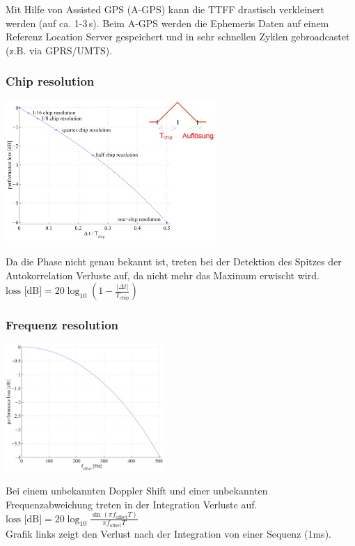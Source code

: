 	Mit Hilfe von Assisted GPS (A-GPS) kann die TTFF drastisch verkleinert werden (auf ca. 1-3\,s). Beim A-GPS werden die 
	Ephemeris Daten auf einem Referenz Location Server gespeichert und in sehr schnellen Zyklen gebroadcastet (z.B. via GPRS/UMTS).
	
\subsubsection{Chip resolution}
	\begin{minipage}{10cm}
	    \includegraphics[width=8cm]{./bilder/GPS-ChipResolution.png}
    \end{minipage}
	\begin{minipage}{8cm}
    	Da die Phase nicht genau bekannt ist, treten bei der Detektion des
		Spitzes der Autokorrelation Verluste auf, da nicht mehr das Maximum erwischt
		wird.\\
		$\text{loss [dB]}= 20 \log_{10}\left(1-\frac{|\Delta
		t|}{T_{\mathrm{chip}}}\right)$\\
    \end{minipage}
\subsubsection{Frequenz resolution}
	\begin{minipage}{8cm}
    	\includegraphics[width=6cm]{./bilder/GPS-FrequenzResolution.png}
    \end{minipage}
	\begin{minipage}{10cm}
	    Bei einem unbekannten Doppler Shift und einer unbekannten Frequenzabweichung
		treten in der Integration Verluste auf.\\
		$\text{loss [dB]}= 20 \log_{10} \frac{\sin(\pi f_{\mathrm{offset}}T)} {\pi
		f_{\mathrm{offset}}T}$\\
     	Grafik links zeigt den Verlust nach der Integration von einer Sequenz
     	(1ms).
    \end{minipage}

